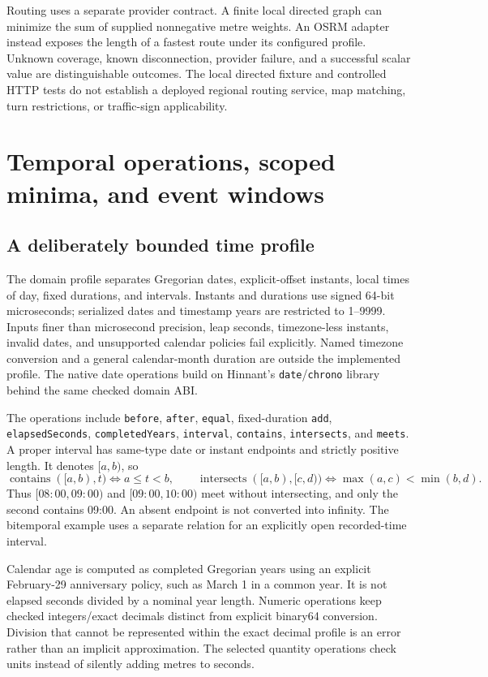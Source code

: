 \documentclass{article}
\newcommand{\code}[1]{\texttt{#1}}
\begin{document}
Routing uses a separate provider contract. A finite local directed graph can
minimize the sum of supplied nonnegative metre weights. An OSRM adapter instead
exposes the length of a fastest route under its configured profile. Unknown
coverage, known disconnection, provider failure, and a successful scalar value
are distinguishable outcomes. The local directed fixture and controlled HTTP
tests do not establish a deployed regional routing service, map matching, turn
restrictions, or traffic-sign applicability.

\section{Temporal operations, scoped minima, and event windows}
\label{sec:temporal}
\subsection{A deliberately bounded time profile}
The domain profile separates Gregorian dates, explicit-offset instants, local
times of day, fixed durations, and intervals. Instants and durations use signed
64-bit microseconds; serialized dates and timestamp years are restricted to
1--9999. Inputs finer than microsecond precision, leap seconds, timezone-less
instants, invalid dates, and unsupported calendar policies fail explicitly.
Named timezone conversion and a general calendar-month duration are outside
the implemented profile. The native date operations build on Hinnant's
\code{date}/\code{chrono} library~\cite{hinnantdate} behind the same checked domain ABI.

The operations include \code{before}, \code{after}, \code{equal}, fixed-duration
\code{add}, \code{elapsedSeconds}, \code{completedYears}, \code{interval},
\code{contains}, \code{intersects}, and \code{meets}. A proper interval has
same-type date or instant endpoints and strictly positive length. It denotes
$[a,b)$, so
\[
\operatorname{contains}([a,b),t)\iff a\leq t<b,
\qquad
\operatorname{intersects}([a,b),[c,d))\iff\max(a,c)<\min(b,d).
\]
Thus $[08{:}00,09{:}00)$ and $[09{:}00,10{:}00)$ meet without intersecting,
and only the second contains 09:00. An absent endpoint is not converted into
infinity. The bitemporal example uses a separate relation for an explicitly
open recorded-time interval.

Calendar age is computed as completed Gregorian years using an explicit
February-29 anniversary policy, such as March 1 in a common year. It is not
elapsed seconds divided by a nominal year length. Numeric operations keep
checked integers/exact decimals distinct from explicit binary64 conversion.
Division that cannot be represented within the exact decimal profile is an
error rather than an implicit approximation. The selected quantity operations
check units instead of silently adding metres to seconds.
\end{document}
